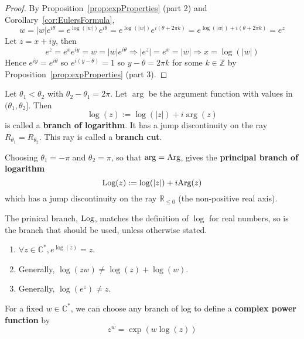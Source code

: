 \begin{proof}
	By Proposition~\ref{prop:expProperties} (part 2) and Corollary~\ref{cor:EulersFormula},
	\[
		w = |w| e^{i \theta} = e^{\log(|w|)} e^{i \theta} = e^{\log(|w|)} e^{i (\theta + 2 \pi k)} = e^{\log(|w|) + i (\theta + 2 \pi k)} = e^z
	\]
	Let $z = x + iy$, then
	\[
		e^z = e^x e^{iy} = w = |w| e^{i \theta} \Longrightarrow |e^z| = e^x = |w| \Longrightarrow x = \log(|w|)
	\]
	Hence $e^{iy} = e^{i \theta}$ so $e^{i(y - \theta)} = 1$ so $y - \theta = 2 \pi k$ for some $k \in \mathbb{Z}$ by Proposition~\ref{prop:expProperties} (part 3).
\end{proof}

\begin{definition}
	Let $\theta_1 < \theta_2$ with $\theta_2 - \theta_1 = 2 \pi$. Let $\arg$ be the argument function with values in $(\theta_1, \theta_2]$. Then
	\[
		\log(z) := \log(|z|) + i \arg(z)
	\]
	is called a \textbf{branch of logarithm}. It has a jump discontinuity on the ray $R_{\theta_1} = R_{\theta_2}$. This ray is called a \textbf{branch cut}.
\end{definition}

\begin{definition}
	Choosing $\theta_1 = -\pi$ and $\theta_2 = \pi$, so that $\arg = \text{Arg}$, gives the \textbf{principal branch of logarithm}
	\[
		\text{Log}(z) := \log(|z|) + i \text{Arg}(z)
	\]
	which has a jump discontinuity on the ray $\mathbb{R}_{\le 0}$ (the non-positive real axis).
\end{definition}

\begin{remark}
	The prinical branch, $\text{Log}$, matches the definition of $\log$ for real numbers, so is the branch that should be used, unless otherwise stated.
\end{remark}

\begin{lemma}
	\hfill
	\begin{enumerate}
		\item $\forall z \in \mathbb{C}^*, e^{\log(z)} = z$.
		\item Generally, $\log(zw) \ne \log(z) + \log(w)$.
		\item Generally, $\log(e^z) \ne z$.
	\end{enumerate}
\end{lemma}

\begin{definition}
	For a fixed $w \in \mathbb{C}^*$, we can choose any branch of log to define a \textbf{complex power function} by
	\[
		z^w = \exp(w \log(z))
	\]
\end{definition}

